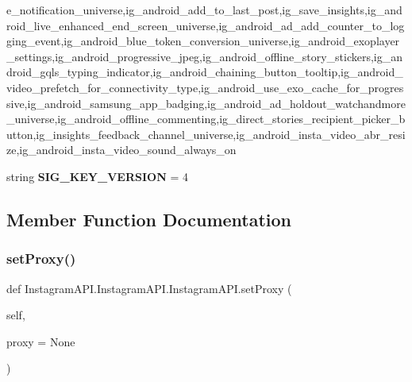 \begin{DoxyCompactItemize}
$$e\+\_\+notification\+\_\+universe,ig\+\_\+android\+\_\+add\+\_\+to\+\_\+last\+\_\+post,ig\+\_\+save\+\_\+insights,ig\+\_\+android\+\_\+live\+\_\+enhanced\+\_\+end\+\_\+screen\+\_\+universe,ig\+\_\+android\+\_\+ad\+\_\+add\+\_\+counter\+\_\+to\+\_\+logging\+\_\+event,ig\+\_\+android\+\_\+blue\+\_\+token\+\_\+conversion\+\_\+universe,ig\+\_\+android\+\_\+exoplayer\+\_\+settings,ig\+\_\+android\+\_\+progressive\+\_\+jpeg,ig\+\_\+android\+\_\+offline\+\_\+story\+\_\+stickers,ig\+\_\+android\+\_\+gqls\+\_\+typing\+\_\+indicator,ig\+\_\+android\+\_\+chaining\+\_\+button\+\_\+tooltip,ig\+\_\+android\+\_\+video\+\_\+prefetch\+\_\+for\+\_\+connectivity\+\_\+type,ig\+\_\+android\+\_\+use\+\_\+exo\+\_\+cache\+\_\+for\+\_\+progressive,ig\+\_\+android\+\_\+samsung\+\_\+app\+\_\+badging,ig\+\_\+android\+\_\+ad\+\_\+holdout\+\_\+watchandmore\+\_\+universe,ig\+\_\+android\+\_\+offline\+\_\+commenting,ig\+\_\+direct\+\_\+stories\+\_\+recipient\+\_\+picker\+\_\+button,ig\+\_\+insights\+\_\+feedback\+\_\+channel\+\_\+universe,ig\+\_\+android\+\_\+insta\+\_\+video\+\_\+abr\+\_\+resize,ig\+\_\+android\+\_\+insta\+\_\+video\+\_\+sound\+\_\+always\+\_\+on\textquotesingle{}\textquotesingle{}\textquotesingle{}
\item 
\mbox{\label{class_instagram_a_p_i_1_1_instagram_a_p_i_1_1_instagram_a_p_i_ae745316ac80b348295f4b04a9e440538}} 
string {\bfseries S\+I\+G\+\_\+\+K\+E\+Y\+\_\+\+V\+E\+R\+S\+I\+ON} = \textquotesingle{}4\textquotesingle{}
\end{DoxyCompactItemize}


\subsection{Member Function Documentation}
\mbox{\label{class_instagram_a_p_i_1_1_instagram_a_p_i_1_1_instagram_a_p_i_a0dba831021f4b752ae2216209a68521e}} 
\subsubsection{\texorpdfstring{set\+Proxy()}{setProxy()}}
{\footnotesize\ttfamily def Instagram\+A\+P\+I.\+Instagram\+A\+P\+I.\+Instagram\+A\+P\+I.\+set\+Proxy (\begin{DoxyParamCaption}\item[{}]{self,  }\item[{}]{proxy = {\ttfamily None} }\end{DoxyParamCaption})}

